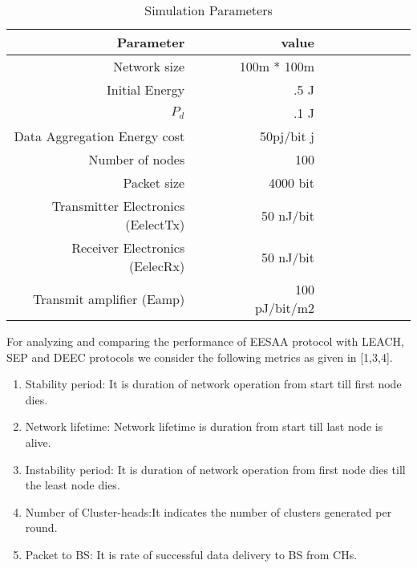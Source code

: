 \documentclass[journal]{IEEEtran}
\begin{document}
\begin{table}[h]
  \centering
  \caption{Simulation Parameters}
    \begin{tabular}{rrrrrrrrrr|rr}
Parameter                                                           &       &       &       & value &  \\ \hline
Network size        &       &       &       &            100m * 100m      &  \\\hline
    Initial Energy        &       &       &       &                .5 J      &  \\\hline
    $P_{d} $      &       &       &       &                      .1 J      &  \\\hline
    Data Aggregation Energy cost      &       &       &       &                      50pj/bit j      &  \\\hline
    Number of nodes       &       &       &       &                     100      &  \\\hline
    Packet size        &       &       &       &             4000 bit       &  \\\hline
    Transmitter Electronics (EelectTx) &       &       &       & 50 nJ/bit      &  \\\hline
    Receiver Electronics (EelecRx)     &       &       &       & 50 nJ/bit &  \\\hline
    Transmit amplifier (Eamp)            &       &       &       & 100 pJ/bit/m2 &  \\\hline

\end{tabular}\end{table}

For analyzing and comparing the performance of EESAA protocol with LEACH, SEP and DEEC protocols we consider the following metrics as given in [1,3,4].

\begin{enumerate}
  \item Stability period: It is duration of network operation from start till first node dies.
  \item Network lifetime: Network lifetime is duration from start till last node is alive.
   \item Instability period: It is duration of network operation from first node dies till the least node dies.
  \item Number of Cluster-heads:It indicates the number of clusters generated per round.
  \item Packet to BS: It is rate of successful data delivery to BS from CHs.
  \end{enumerate}
\end{document}

